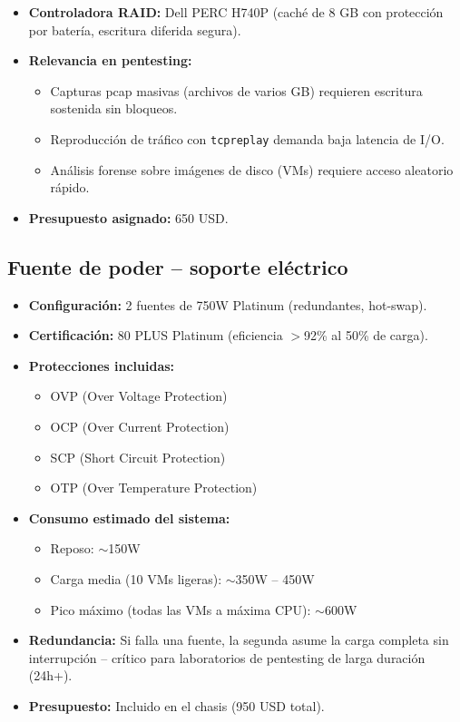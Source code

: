 \documentclass[12pt, letterpaper]{article}
\begin{document}
\begin{itemize}
    \item \textbf{Controladora RAID:} Dell PERC H740P (caché de 8 GB con protección por batería, escritura diferida segura).
    \item \textbf{Relevancia en pentesting:}
        \begin{itemize}
            \item Capturas pcap masivas (archivos de varios GB) requieren escritura sostenida sin bloqueos.
            \item Reproducción de tráfico con \texttt{tcpreplay} demanda baja latencia de I/O.
            \item Análisis forense sobre imágenes de disco (VMs) requiere acceso aleatorio rápido.
        \end{itemize}
    \item \textbf{Presupuesto asignado:} 650 USD.
\end{itemize}

\subsection{Fuente de poder – soporte eléctrico}

\begin{itemize}
    \item \textbf{Configuración:} 2 fuentes de 750W Platinum (redundantes, hot-swap).
    \item \textbf{Certificación:} 80 PLUS Platinum (eficiencia $>$92\% al 50\% de carga).
    \item \textbf{Protecciones incluidas:}
        \begin{itemize}
            \item OVP (Over Voltage Protection)
            \item OCP (Over Current Protection)
            \item SCP (Short Circuit Protection)
            \item OTP (Over Temperature Protection)
        \end{itemize}
    \item \textbf{Consumo estimado del sistema:}
        \begin{itemize}
            \item Reposo: $\sim$150W
            \item Carga media (10 VMs ligeras): $\sim$350W – 450W
            \item Pico máximo (todas las VMs a máxima CPU): $\sim$600W
        \end{itemize}
    \item \textbf{Redundancia:} Si falla una fuente, la segunda asume la carga completa sin interrupción – crítico para laboratorios de pentesting de larga duración (24h+).
    \item \textbf{Presupuesto:} Incluido en el chasis (950 USD total).
\end{itemize}
\end{document}
